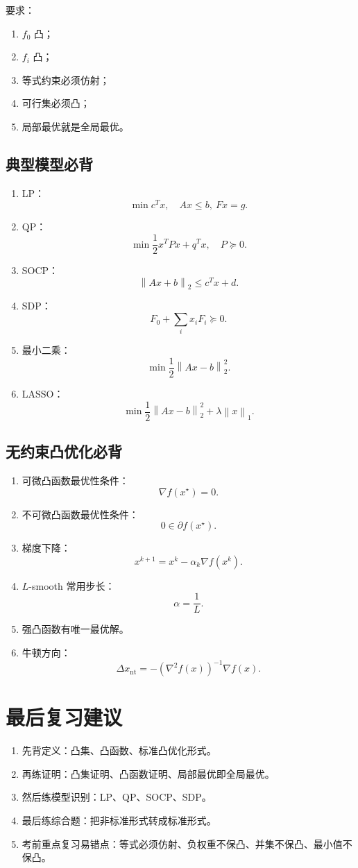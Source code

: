 \documentclass[11pt,a4paper]{ctexart}
\newcommand{\norm}[1]{\left\lVert #1 \right\rVert}
\theoremstyle{definition}
\theoremstyle{plain}
\theoremstyle{remark}
\begin{document}
要求：

\begin{enumerate}[label=\arabic*.]
    \item $f_0$ 凸；
    \item $f_i$ 凸；
    \item 等式约束必须仿射；
    \item 可行集必须凸；
    \item 局部最优就是全局最优。
\end{enumerate}

\subsection*{典型模型必背}

\begin{enumerate}[label=\arabic*.]
    \item LP：
    \[
        \min c^Tx,\quad Ax\le b,\ Fx=g.
    \]
    \item QP：
    \[
        \min \frac12x^TPx+q^Tx,\quad P\succeq0.
    \]
    \item SOCP：
    \[
        \norm{Ax+b}_2\le c^Tx+d.
    \]
    \item SDP：
    \[
        F_0+\sum_i x_iF_i\succeq0.
    \]
    \item 最小二乘：
    \[
        \min \frac12\norm{Ax-b}_2^2.
    \]
    \item LASSO：
    \[
        \min \frac12\norm{Ax-b}_2^2+\lambda\norm{x}_1.
    \]
\end{enumerate}

\subsection*{无约束凸优化必背}

\begin{enumerate}[label=\arabic*.]
    \item 可微凸函数最优性条件：
    \[
        \nabla f(x^\star)=0.
    \]
    \item 不可微凸函数最优性条件：
    \[
        0\in\partial f(x^\star).
    \]
    \item 梯度下降：
    \[
        x^{k+1}=x^k-\alpha_k\nabla f(x^k).
    \]
    \item $L$-smooth 常用步长：
    \[
        \alpha=\frac1L.
    \]
    \item 强凸函数有唯一最优解。
    \item 牛顿方向：
    \[
        \Delta x_{\mathrm{nt}}
        =
        -(\nabla^2 f(x))^{-1}\nabla f(x).
    \]
\end{enumerate}

\section{最后复习建议}

\begin{enumerate}[label=\arabic*.]
    \item 先背定义：凸集、凸函数、标准凸优化形式。
    \item 再练证明：凸集证明、凸函数证明、局部最优即全局最优。
    \item 然后练模型识别：LP、QP、SOCP、SDP。
    \item 最后练综合题：把非标准形式转成标准形式。
    \item 考前重点复习易错点：等式必须仿射、负权重不保凸、并集不保凸、最小值不保凸。
\end{enumerate}
\end{document}
